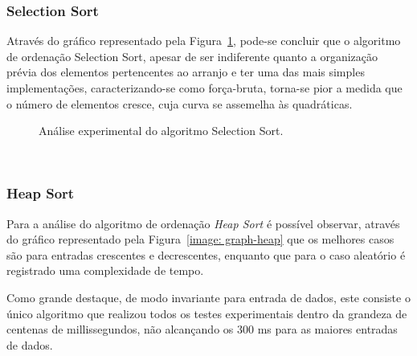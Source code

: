\documentclass[conference]{IEEEtran}
\begin{document}
\subsubsection{Selection Sort}

Através do gráfico representado pela Figura~\ref{image: graph-selection}, pode-se concluir que o algoritmo de ordenação Selection Sort, apesar de ser indiferente quanto a organização prévia dos elementos pertencentes ao arranjo e ter uma das mais simples implementações, caracterizando-se como força-bruta, torna-se pior a medida que o número de elementos cresce, cuja curva se assemelha às quadráticas.

\begin{figure}


\centering
{}
\caption{Análise experimental do algoritmo Selection Sort.}
\label{image: graph-selection}
\end{figure}



~\\
\subsubsection{Heap Sort}

Para a análise do algoritmo de ordenação \textit{Heap Sort} é possível observar, através do gráfico representado pela Figura~\ref{image: graph-heap} que os melhores casos são para entradas crescentes e decrescentes, enquanto que para o caso aleatório é registrado uma complexidade de tempo. 

Como grande destaque, de modo invariante para entrada de dados, este consiste o único algoritmo que realizou todos os testes experimentais dentro da grandeza de centenas de millissegundos, não alcançando os 300 ms para as maiores entradas de dados.
\end{document}
